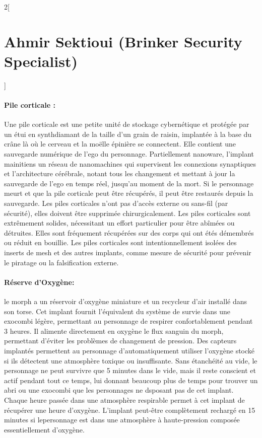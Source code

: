 \documentclass[a4paper,9pt]{article}
\begin{document}
\begin{multicols}{2}[\section*{Ahmir Sektioui (Brinker Security Specialist)}]
   \paragraph{Pile corticale :}
   Une pile corticale est une petite unité de stockage cybernétique et protégée
   par un étui en synthdiamant de la taille d'un grain de raisin, implantée à la
   base du crâne là où le cerveau et la moëlle épinière se connectent. Elle
   contient une sauvegarde numérique de l'ego du personnage. Partiellement
   nanoware, l'implant mainitiens un réseau de nanomachines qui supervisent
   les connexions synaptiques et l'architecture cérébrale, notant tous les
   changement et mettant à jour la sauvegarde de l'ego en temps réel, jusqu'au
   moment de la mort. Si le personnage meurt et que la pile corticale peut être
   récupérés, il peut être restaurés depuis la sauvegarde. Les piles corticales
   n'ont pas d'accès externe ou sans-fil (par sécurité), elles doivent être
   supprimée chirurgicalement. Les piles corticales sont extrêmement solides,
   nécessitant un effort particulier pour être abîmées ou détruites. Elles sont
   fréquement récupérées sur des corps qui ont étés démembrés ou réduit en
   bouillie. Les piles corticales sont intentionnellement isolées des inserts de
   mesh et des autres implants, comme mesure de sécurité pour prévenir le piratage
   ou la falsification externe.

   \paragraph{Réserve d'Oxygène:} le morph a un réservoir d'oxygène miniature et un
   recycleur d'air installé dans son torse. Cet implant fournit l'équivalent du
   système de survie dans une exocombi légère, permettant au personnage de
   respirer confortablement pendant 3 heures. Il alimente directement en oxygène
   le flux sanguin du morph, permettant d'éviter les problèmes de changement de
   pression. Des capteurs implantés permettent au personnage d'automatiquement
   utiliser l'oxygène stocké si ils détectent une atmosphère toxique ou
   insuffisante. Sans étanchéité au vide, le personnage ne peut survivre que 5
   minutes dans le vide, mais il reste conscient et actif pendant tout ce temps,
   lui donnant beaucoup plus de temps pour trouver un abri ou une exocombi que les
   personnages ne dsposant pas de cet implant. Chaque heure passée dans une
   atmosphère respirable permet à cet implant de récupérer une heure d'oxygène.
   L'implant peut-être complètement rechargé en 15 minutes si lepersonnage est
   dans une atmosphère à haute-pression composée essentiellement d'oxygène.

\end{multicols}
\end{document}
